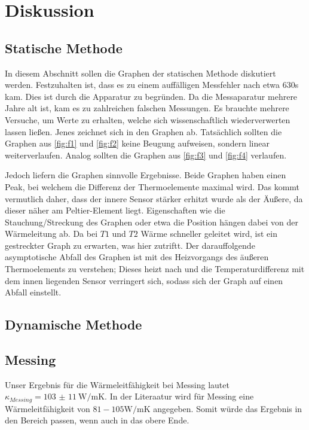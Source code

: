 \section{Diskussion}
\label{sec:Diskussion}

\subsection{Statische Methode}
In diesem Abschnitt sollen die Graphen der statischen Methode diskutiert werden.
Festzuhalten ist, dass es zu einem auffälligen Messfehler nach etwa 630s kam.
Dies ist durch die Apparatur zu begründen. Da die Messaparatur mehrere Jahre 
alt ist, kam es zu zahlreichen falschen Messungen. Es brauchte mehrere Versuche, 
um Werte zu erhalten, welche sich wissenschaftlich wiederverwerten lassen ließen.
Jenes zeichnet sich in den Graphen ab. Tatsächlich sollten die Graphen aus 
\autoref{fig:f1} und \autoref{fig:f2} keine Beugung aufweisen, sondern linear 
weiterverlaufen. Analog sollten die Graphen aus \autoref{fig:f3} und \autoref{fig:f4}
verlaufen.
\par\vspace{0.5em}
\noindent Jedoch liefern die Graphen sinnvolle Ergebnisse. Beide Graphen 
haben einen Peak, bei welchem die Differenz der Thermoelemente maximal wird.
Das kommt vermutlich daher, dass der innere Sensor stärker erhitzt wurde als 
der Äußere, da dieser näher am Peltier-Element liegt. Eigenschaften wie die 
Stauchung/Streckung des Graphen oder etwa die Position hängen dabei von der 
Wärmeleitung ab. Da bei $T1$ und $T2$ Wärme schneller geleitet wird, ist ein 
gestreckter Graph zu erwarten, was hier zutriftt. Der darauffolgende asymptotische 
Abfall des Graphen ist mit des Heizvorgangs des äußeren Thermoelements zu verstehen;
Dieses heizt nach und die Temperaturdifferenz mit dem innen liegenden Sensor 
verringert sich, sodass sich der Graph auf einen Abfall einstellt.

\subsection{Dynamische Methode}

\subsection{Messing}
\noindent Unser Ergebnis für die Wärmeleitfähigkeit bei Messing lautet $
\kappa_{Messing} = \qty{103(11)}{\watt\per\meter\kelvin}$. In der 
Literaatur wird für Messing eine Wärmeleitfähigkeit von $81-105 \unit{\watt\per\meter\kelvin}
$ angegeben. Somit würde das Ergebnis in den Bereich passen, wenn auch in das obere Ende. 
